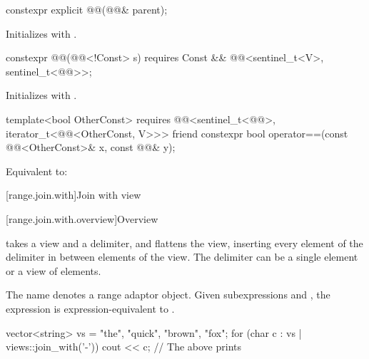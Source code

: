 %
\begin{itemdecl}
constexpr explicit @@(@@& parent);
\end{itemdecl}

\begin{itemdescr}
\pnum
\effects
Initializes  with .
\end{itemdescr}

%
\begin{itemdecl}
constexpr @@(@@<!Const> s)
  requires Const && @@<sentinel_t<V>, sentinel_t<@@>>;
\end{itemdecl}

\begin{itemdescr}
\pnum
\effects
Initializes  with .
\end{itemdescr}

\begin{itemdecl}
template<bool OtherConst>
  requires @@<sentinel_t<@@>, iterator_t<@@<OtherConst, V>>>
friend constexpr bool operator==(const @@<OtherConst>& x, const @@& y);
\end{itemdecl}

\begin{itemdescr}
\pnum
\effects
Equivalent to: 
\end{itemdescr}

[range.join.with]{Join with view}

[range.join.with.overview]{Overview}

\pnum
{} takes a view and a delimiter, and
flattens the view,
inserting every element of the delimiter
in between elements of the view.
The delimiter can be a single element or a view of elements.

\pnum
{}%
The name  denotes
a range adaptor object.
Given subexpressions  and ,
the expression  is expression-equivalent to
.

\pnum
\begin{example}
\begin{codeblock}
vector<string> vs = {"the", "quick", "brown", "fox"};
for (char c : vs | views::join_with('-')) {
  cout << c;
}
// The above prints 
\end{codeblock}
\end{example}

